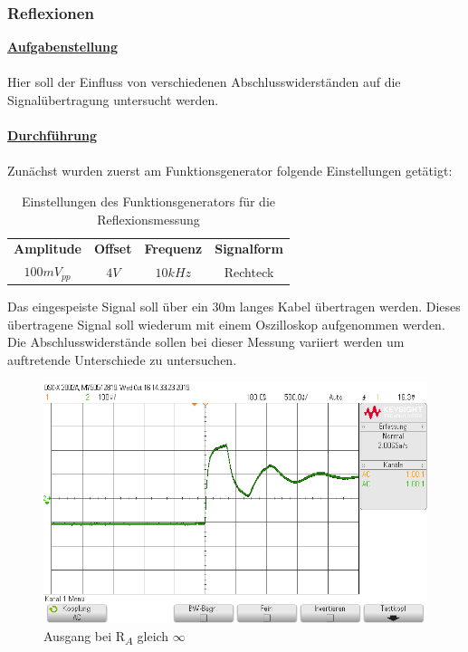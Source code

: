 \documentclass[a4paper,12pt]{article}
\begin{document}
	\subsubsection{Reflexionen}
	\underline{\textbf{Aufgabenstellung}} \\ \\
	Hier soll der Einfluss von verschiedenen Abschlusswiderständen auf die Signalübertragung untersucht werden. \\ \\
	\underline{\textbf{Durchführung}} \\ \\
	Zunächst wurden zuerst am Funktionsgenerator folgende Einstellungen getätigt:
	\begin{table}[h]
		\centering
		\begin{tabular}{|c|c|c|c|}
			\hline
			\multirow{2}{*}{\textbf{Amplitude}} & \multirow{2}{*}{\textbf{Offset}} & \multirow{2}{*}{\textbf{Frequenz}} & \multirow{2}{*}{\textbf{Signalform}} \\
			&  &  &  \\ \hline
			\multirow{2}{*}{$100mV_{pp}$} & \multirow{2}{*}{$4V$} & \multirow{2}{*}{$10kHz$} & \multirow{2}{*}{Rechteck} \\
			&  &  &  \\ \hline
		\end{tabular}
		\caption{Einstellungen des Funktionsgenerators für die Reflexionsmessung}
	\end{table}
	\newline
	Das eingespeiste Signal soll über ein 30m langes Kabel übertragen werden. Dieses übertragene Signal soll wiederum mit einem Oszilloskop aufgenommen werden. Die Abschlusswiderstände sollen bei dieser Messung variiert werden um auftretende Unterschiede zu untersuchen.
	\begin{figure}[h]
		\centering
		\includegraphics[width=12cm]{img/RA_unendlich}
		\caption{Ausgang bei R\textsubscript{$A$} gleich $\infty$}
	\end{figure}
\end{document}
